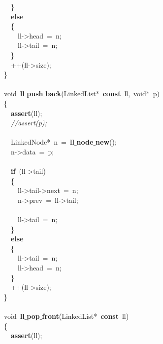 \documentclass{article}
\begin{document}
\mbox{}\ \ \} \\
\mbox{}\ \ \textbf{else} \\
\mbox{}\ \ \{ \\
\mbox{}\ \ \ \ ll-\textgreater{}head\ =\ n; \\
\mbox{}\ \ \ \ ll-\textgreater{}tail\ =\ n; \\
\mbox{}\ \ \} \\
\mbox{}\ \ ++(ll-\textgreater{}size); \\
\mbox{}\} \\
\mbox{} \\
\mbox{}void\ \textbf{ll$\_$push$\_$back}(LinkedList*\ \textbf{const}\ ll,\ void*\ p) \\
\mbox{}\{ \\
\mbox{}\ \ \textbf{assert}(ll); \\
\mbox{}\ \ \textit{//assert(p);} \\
\mbox{} \\
\mbox{}\ \ LinkedNode*\ n\ =\ \textbf{ll$\_$node$\_$new}(); \\
\mbox{}\ \ n-\textgreater{}data\ =\ p; \\
\mbox{} \\
\mbox{}\ \ \textbf{if}\ (ll-\textgreater{}tail) \\
\mbox{}\ \ \{ \\
\mbox{}\ \ \ \ ll-\textgreater{}tail-\textgreater{}next\ =\ n; \\
\mbox{}\ \ \ \ n-\textgreater{}prev\ =\ ll-\textgreater{}tail; \\
\mbox{} \\
\mbox{}\ \ \ \ ll-\textgreater{}tail\ =\ n; \\
\mbox{}\ \ \} \\
\mbox{}\ \ \textbf{else} \\
\mbox{}\ \ \{ \\
\mbox{}\ \ \ \ ll-\textgreater{}tail\ =\ n; \\
\mbox{}\ \ \ \ ll-\textgreater{}head\ =\ n; \\
\mbox{}\ \ \} \\
\mbox{}\ \ ++(ll-\textgreater{}size); \\
\mbox{}\} \\
\mbox{} \\
\mbox{}void\ \textbf{ll$\_$pop$\_$front}(LinkedList*\ \textbf{const}\ ll) \\
\mbox{}\{ \\
\mbox{}\ \ \textbf{assert}(ll); \\
\mbox{} \\
\end{document}

